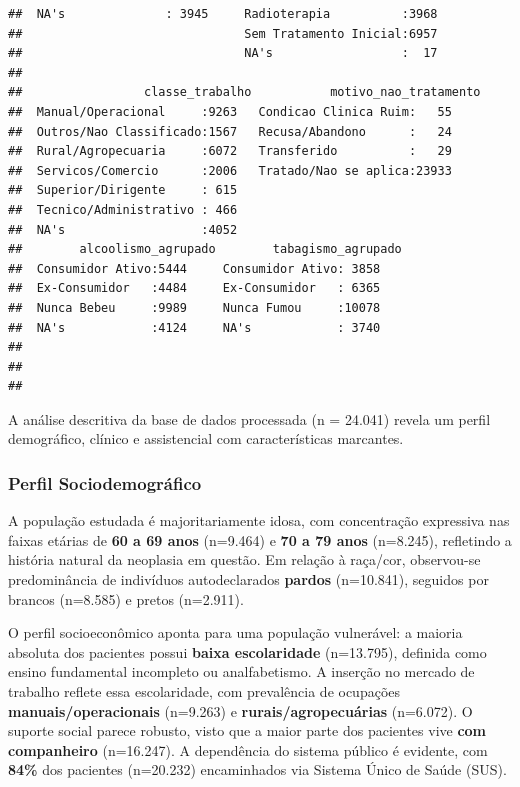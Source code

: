 \documentclass[
]{article}
\begin{document}
\begin{verbatim}
##  NA's              : 3945     Radioterapia          :3968    
##                               Sem Tratamento Inicial:6957    
##                               NA's                  :  17    
##                                                              
##                 classe_trabalho           motivo_nao_tratamento
##  Manual/Operacional     :9263   Condicao Clinica Ruim:   55    
##  Outros/Nao Classificado:1567   Recusa/Abandono      :   24    
##  Rural/Agropecuaria     :6072   Transferido          :   29    
##  Servicos/Comercio      :2006   Tratado/Nao se aplica:23933    
##  Superior/Dirigente     : 615                                  
##  Tecnico/Administrativo : 466                                  
##  NA's                   :4052                                  
##        alcoolismo_agrupado        tabagismo_agrupado
##  Consumidor Ativo:5444     Consumidor Ativo: 3858   
##  Ex-Consumidor   :4484     Ex-Consumidor   : 6365   
##  Nunca Bebeu     :9989     Nunca Fumou     :10078   
##  NA's            :4124     NA's            : 3740   
##                                                     
##                                                     
## 
\end{verbatim}

A análise descritiva da base de dados processada (n = 24.041) revela um
perfil demográfico, clínico e assistencial com características
marcantes.

\subsubsection{Perfil
Sociodemográfico}\label{perfil-sociodemogruxe1fico}

A população estudada é majoritariamente idosa, com concentração
expressiva nas faixas etárias de \textbf{60 a 69 anos} (n=9.464) e
\textbf{70 a 79 anos} (n=8.245), refletindo a história natural da
neoplasia em questão. Em relação à raça/cor, observou-se predominância
de indivíduos autodeclarados \textbf{pardos} (n=10.841), seguidos por
brancos (n=8.585) e pretos (n=2.911).

O perfil socioeconômico aponta para uma população vulnerável: a maioria
absoluta dos pacientes possui \textbf{baixa escolaridade} (n=13.795),
definida como ensino fundamental incompleto ou analfabetismo. A inserção
no mercado de trabalho reflete essa escolaridade, com prevalência de
ocupações \textbf{manuais/operacionais} (n=9.263) e
\textbf{rurais/agropecuárias} (n=6.072). O suporte social parece
robusto, visto que a maior parte dos pacientes vive \textbf{com
companheiro} (n=16.247). A dependência do sistema público é evidente,
com \textbf{84\%} dos pacientes (n=20.232) encaminhados via Sistema
Único de Saúde (SUS).
\end{document}
